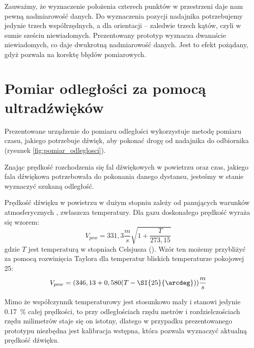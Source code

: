 Zauważmy, że wyznaczenie położenia czterech punktów w przestrzeni daje nam pewną nadmiarowość
danych. Do wyznaczenia pozycji nadajnika potrzebujemy jedynie trzech współrzędnych,
a dla orientacji -- zaledwie trzech kątów, czyli w sumie sześciu niewiadomych.
Prezentowany prototyp wyznacza  dwanaście niewiadomych, co daje dwukrotną nadmiarowość danych.
Jest to efekt pożądany, gdyż pozwala na korektę błędów pomiarowych.


\section{Pomiar odległości za pomocą ultradźwięków}

Prezentowane urządzenie do pomiaru odległości wykorzystuje metodę pomiaru czasu, jakiego
potrzebuje dźwięk, aby pokonać drogę od nadajnika do odbiornika
(rysunek \ref{fig:pomiar_odleglosci}).

Znając prędkość rozchodzenia się fal dźwiękowych w powietrzu oraz czas, jakiego fala dźwiękowa potrzebowała
do pokonania danego dystansu, jesteśmy w stanie wyznaczyć szukaną odległość.

Prędkość dźwięku w powietrzu w dużym stopniu zależy od panujących warunków atmosferycznych \cite{bib:soundSpeed},
zwłaszcza temperatury.
Dla gazu doskonałego prędkość wyraża się wzorem:
\[
V_{pow} = 331,3  \frac{m}{s}  \sqrt{1+\frac{T}{273,15}}
\]
gdzie $T$ jest temperaturą w stopniach Celsjusza (\SI{}{\degC}).
Wzór ten możemy przybliżyć za pomocą rozwinięcia Taylora dla temperatur bliskich temperaturze pokojowej \SI{25}{\degC}:
\[
 V_{pow} = (346,13  +  0,580(T - \SI{25}{\arcdeg}))  \frac{m}{s} 
\]

Mimo że współczynnik temperaturowy jest stosunkowo mały i stanowi jedynie \SI{0,17}{\%} całej prędkości,
to przy odległościach rzędu metrów i rozdzielczościach rzędu milimetrów staje się on istotny, 
dlatego w przypadku prezentowanego prototypu niezbędna jest kalibracja wstępna, która pozwala
wyznaczyć aktualną prędkość dźwięku.





